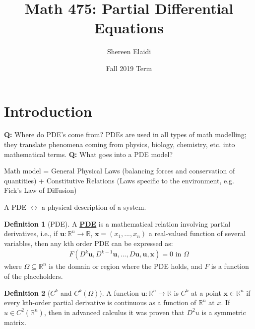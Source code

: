 \documentclass[11pt]{scrartcl}
\title{\textbf{Math 475: Partial Differential Equations}}
\author{Shereen Elaidi}
\date{Fall 2019 Term}
\theoremstyle{definition}
\newtheorem{definition}{Definition}
\theoremstyle{remark}
\newcommand{\dfn}[1]{\textbf{\underline{#1}}}
\newcommand{\vect}[1]{\mathbf{#1}}
\newcommand{\R}[0]{\mathbb{R}}
\begin{document}
\maketitle
\tableofcontents

\section{Introduction}

\textbf{Q:} Where do PDE's come from? PDEs are used in all types of math modelling; they translate phenomena coming from physics, biology, chemistry, etc. into mathematical terms. 
\newline 
\newline 
\textbf{Q:} What goes into a PDE model? 
\begin{center}
	Math model = General Physical Laws (balancing forces and conservation of quantities) + Constitutive Relations (Laws specific to the environment, e.g. Fick's Law of Diffusion) 
\end{center}
A PDE $\leftrightarrow$ a physical description of a system. 

\begin{definition}[PDE]
	A \dfn{PDE} is a mathematical relation involving partial derivatives, i.e., if $\vect{u}: \R^n \rightarrow \R$, $\vect{x} = (x_1, ..., x_n)$ a real-valued function of several variables, then any kth order PDE can be expressed as: 
	\begin{align}
		F(D^k \vect{u}, D^{k-1} \vect{u}, ..., D \vect{u}, \vect{u}, \vect{x} ) = 0 \text{ in } \Omega 	
	\end{align}
	where $\Omega \subseteq \R^n$ is the domain or region where the PDE holds, and $F$ is a function of the placeholders. 
\end{definition}

\begin{definition}[$C^k$ and $C^k(\Omega)$] A function $\vect{u}: \R^n \rightarrow \R$ is $C^k$ at a point $\vect{x} \in \R^n$ if every kth-order partial derivative is continuous as a function of $\R^n$ at $x$. If $u \in C^2(\R^n)$, then in advanced calculus it was proven that $D^2u$ is a symmetric matrix. 
\end{definition}
\end{document}
